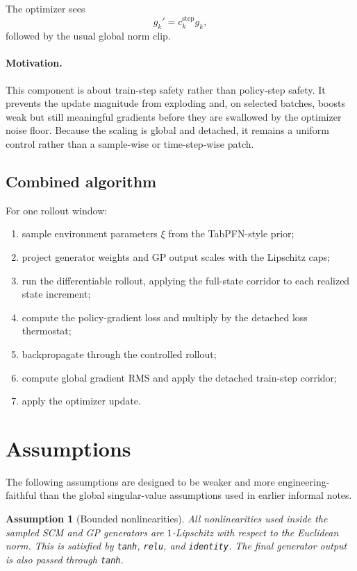 \documentclass[11pt]{article}
\newtheorem{assumption}{Assumption}
\newcommand{\1}{\mathbf{1}}
\begin{document}
The optimizer sees
\begin{equation}
  g_k' = c_k^{\mathrm{step}} g_k,
\end{equation}
followed by the usual global norm clip.

\paragraph{Motivation.}
This component is about train-step safety rather than policy-step safety. It prevents the update magnitude from exploding and, on selected batches, boosts weak but still meaningful gradients before they are swallowed by the optimizer noise floor. Because the scaling is global and detached, it remains a uniform control rather than a sample-wise or time-step-wise patch.

\subsection{Combined algorithm}
For one rollout window:
\begin{enumerate}[label=\arabic*.]
  \item sample environment parameters $\xi$ from the TabPFN-style prior;
  \item project generator weights and GP output scales with the Lipschitz caps;
  \item run the differentiable rollout, applying the full-state corridor to each realized state increment;
  \item compute the policy-gradient loss and multiply by the detached loss thermostat;
  \item backpropagate through the controlled rollout;
  \item compute global gradient RMS and apply the detached train-step corridor;
  \item apply the optimizer update.
\end{enumerate}

\section{Assumptions}
The following assumptions are designed to be weaker and more engineering-faithful than the global singular-value assumptions used in earlier informal notes.

\begin{assumption}[Bounded nonlinearities]
All nonlinearities used inside the sampled SCM and GP generators are $1$-Lipschitz with respect to the Euclidean norm. This is satisfied by \texttt{tanh}, \texttt{relu}, and \texttt{identity}. The final generator output is also passed through \texttt{tanh}.
\end{assumption}
\end{document}
